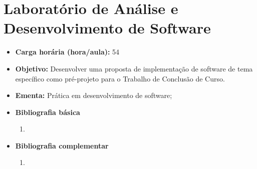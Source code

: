 \documentclass[11pt,fleqn]{book} %
\begin{document}
\newpage
\section{Laboratório de Análise e Desenvolvimento de Software}\label{5_lab}
\begin{itemize}
	\item \textbf{Carga horária (hora/aula):} 54
	\item \textbf{Objetivo:} Desenvolver uma proposta de implementação de software de tema específico como pré-projeto para o Trabalho de Conclusão de Curso.
	\item \textbf{Ementa:} 
	Prática em desenvolvimento de software;
	\item \textbf{Bibliografia básica}
	\begin{enumerate}
		\item 
	\end{enumerate}
	\item \textbf{Bibliografia complementar}
	\begin{enumerate}
		\item 	
	\end{enumerate}	
\end{itemize}



\newpage
\end{document}
